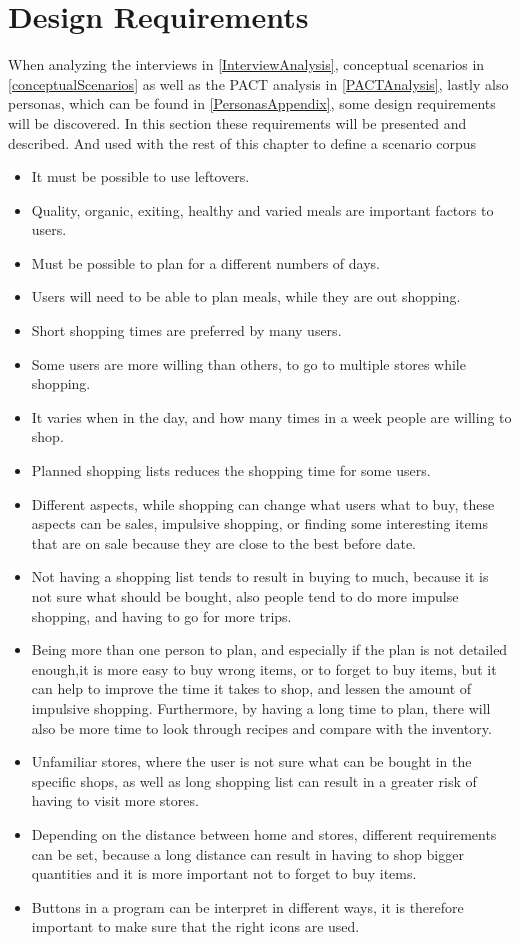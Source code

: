 \section{Design Requirements}
When analyzing the interviews in \cref{InterviewAnalysis}, conceptual scenarios in \cref{conceptualScenarios} as well as the PACT analysis in \cref{PACTAnalysis}, lastly also personas, which can be found in \cref{PersonasAppendix}, some design requirements will be discovered. In this section these requirements will be presented and described. And used with the rest of this chapter to define a scenario corpus

\begin{itemize}
  \item It must be possible to use leftovers.
  \item Quality, organic, exiting, healthy and varied meals are important factors to users.
  \item Must be possible to plan for a different numbers of days.
  \item Users will need to be able to plan meals, while they are out shopping.
  \item Short shopping times are preferred by many users.
  \item Some users are more willing than others, to go to multiple stores while shopping.
  \item It varies when in the day, and how many times in a week people are willing to shop.
  \item Planned shopping lists reduces the shopping time for some users.
  \item Different aspects, while shopping can change what users what to buy, these aspects can be sales, impulsive shopping, or finding some interesting items that are on sale because they are close to the best before date.
  \item Not having a shopping list tends to result in buying to much, because it is not sure what should be bought, also people tend to do more impulse shopping, and having to go for more trips.
  \item Being more than one person to plan, and especially if the plan is not detailed enough,it is more easy to buy wrong items, or to forget to buy items, but it can help to improve the time it takes to shop, and lessen the amount of impulsive shopping. Furthermore, by having a long time to plan, there will also be more time to look through recipes and compare with the inventory.
  \item Unfamiliar stores, where the user is not sure what can be bought in the specific shops, as well as long shopping list can result in a greater risk of having to visit more stores.
  \item Depending on the distance between home and stores, different requirements can be set, because a long distance can result in having to shop bigger quantities and it is more important not to forget to buy items.
  \item Buttons in a program can be interpret in different ways, it is therefore important to make sure that the right icons are used.
\end{itemize}